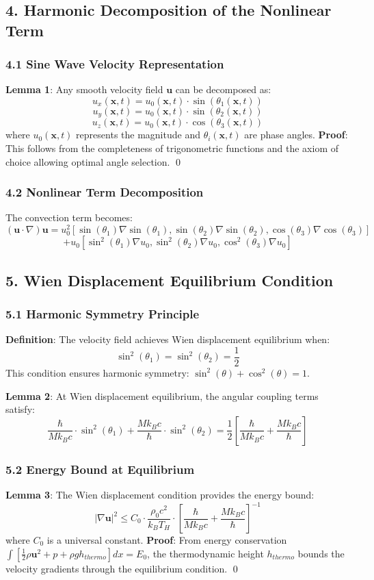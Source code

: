 ﻿\documentclass[12pt]{article}
\begin{document}
\subsection{4. Harmonic Decomposition of the Nonlinear Term}
\subsubsection{4.1 Sine Wave Velocity Representation}
\textbf{Lemma 1}: Any smooth velocity field $\mathbf{u}$ can be decomposed as:
$$u_x(\mathbf{x},t) = u_0(\mathbf{x},t)\cdot\sin(\theta_1(\mathbf{x},t))$$
$$u_y(\mathbf{x},t) = u_0(\mathbf{x},t)\cdot\sin(\theta_2(\mathbf{x},t))$$
$$u_z(\mathbf{x},t) = u_0(\mathbf{x},t)\cdot\cos(\theta_3(\mathbf{x},t))$$
where $u_0(\mathbf{x},t)$ represents the magnitude and $\theta_i(\mathbf{x},t)$ are phase angles.
\textbf{Proof}: This follows from the completeness of trigonometric functions and the axiom of choice allowing optimal angle selection. \qed

\subsubsection{4.2 Nonlinear Term Decomposition}
The convection term becomes:
$$(\mathbf{u}\cdot\nabla)\mathbf{u} = u_0^2\left[\sin(\theta_1)\nabla\sin(\theta_1), \sin(\theta_2)\nabla\sin(\theta_2), \cos(\theta_3)\nabla\cos(\theta_3)\right]$$
$$ + u_0\left[\sin^2(\theta_1)\nabla u_0, \sin^2(\theta_2)\nabla u_0, \cos^2(\theta_3)\nabla u_0\right]$$

\subsection{5. Wien Displacement Equilibrium Condition}
\subsubsection{5.1 Harmonic Symmetry Principle}
\textbf{Definition}: The velocity field achieves Wien displacement equilibrium when:
$$\sin^2(\theta_1) = \sin^2(\theta_2) = \frac{1}{2}$$
This condition ensures harmonic symmetry: $\sin^2(\theta) + \cos^2(\theta) = 1$.

\textbf{Lemma 2}: At Wien displacement equilibrium, the angular coupling terms satisfy:
$$\frac{\hbar}{Mk_Bc}\cdot\sin^2(\theta_1) + \frac{Mk_Bc}{\hbar}\cdot\sin^2(\theta_2) = \frac{1}{2}\left[\frac{\hbar}{Mk_Bc} + \frac{Mk_Bc}{\hbar}\right]$$

\subsubsection{5.2 Energy Bound at Equilibrium}
\textbf{Lemma 3}: The Wien displacement condition provides the energy bound:
$$|\nabla\mathbf{u}|^2 \le C_0\cdot\frac{\rho_0c^2}{k_B T_H} \cdot \left[\frac{\hbar}{Mk_Bc} + \frac{Mk_Bc}{\hbar}\right]^{-1}$$
where $C_0$ is a universal constant.
\textbf{Proof}: From energy conservation $\int[\frac{1}{2}\rho\mathbf{u}^2 + p + \rho gh_{thermo}]dx = E_0$, the thermodynamic height $h_{thermo}$ bounds the velocity gradients through the equilibrium condition. \qed
\end{document}
